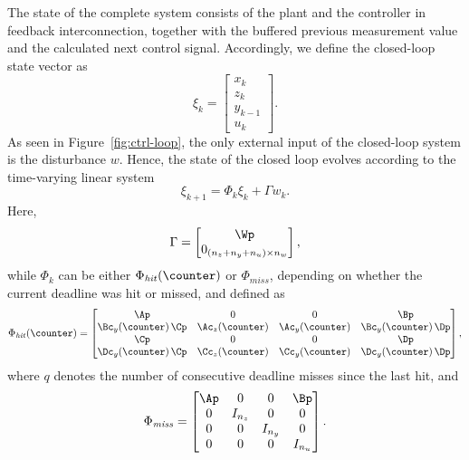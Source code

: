 The state of the complete system consists of the plant and the controller in feedback interconnection, together with the buffered previous measurement value and the calculated next control signal.
Accordingly, we define the closed-loop state vector as
\begin{equation*}
    \xi_k = \begin{bmatrix} x_k \\ z_k \\ y_{k-1} \\ u_k \end{bmatrix} .
\end{equation*}
As seen in Figure~\ref{fig:ctrl-loop}, the only external input of the closed-loop system is the disturbance $w$.
Hence, the state of the closed loop evolves according to the time-varying linear system
\begin{equation}
    \label{eq:cl-system}
    \xi_{k+1} = \Phi_{k} \xi_k + \Gamma w_k.
\end{equation}
Here,
\begin{equation*}
    \Gamma = \begin{bmatrix} \Wp \\ 0_{(n_z+n_y+n_u) \times n_w} \end{bmatrix},
\end{equation*}
while $\Phi_k$ can be either $\Phi_\mathit{hit}(\counter)$ or $\Phi_\mathit{miss}$, depending on whether the current deadline was hit or missed, and defined as
\begin{equation*}
    \Phi_\mathit{hit}(\counter) = \begin{bmatrix} \Ap & 0 & 0 & \Bp \\
    \Bc_y(\counter) \, \Cp & \Ac_z(\counter) & \Ac_y(\counter) & \Bc_y(\counter) \, \Dp \\
    \Cp & 0 & 0 & \Dp \\
    \Dc_y(\counter) \, \Cp & \Cc_z(\counter) & \Cc_y(\counter) & \Dc_y(\counter) \, \Dp
    \end{bmatrix},
\end{equation*}
where $q$ denotes the number of consecutive deadline misses since the last hit, and
\begin{equation*}
    \Phi_\mathit{miss} = \begin{bmatrix} \Ap & 0 & 0 & \Bp \\
    0 & I_{n_z} & 0 & 0 \\
    0 & 0 & I_{n_y} & 0 \\
    0 & 0 & 0 & I_{n_u} \end{bmatrix}.
\end{equation*}

